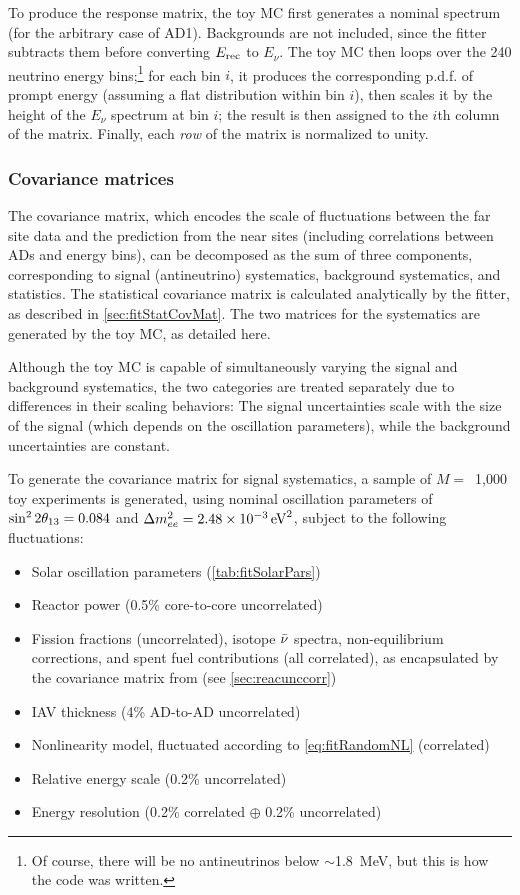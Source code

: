 \documentclass[../thesis.tex]{subfiles}
\begin{document}
To produce the response matrix, the toy MC first generates a nominal spectrum (for the arbitrary case of AD1). Backgrounds are not included, since the fitter subtracts them before converting $E_\mathrm{rec}$ to $E_\nu$. The toy MC then loops over the 240 neutrino energy bins;\footnote{Of course, there will be no antineutrinos below $\sim$1.8~MeV, but this is how the code was written.} for each bin $i$, it produces the corresponding p.d.f. of prompt energy (assuming a flat distribution within bin $i$), then scales it by the height of the $E_\nu$ spectrum at bin $i$; the result is then assigned to the $i$th column of the matrix. Finally, each \emph{row} of the matrix is normalized to unity.

\subsubsection{Covariance matrices}

The covariance matrix, which encodes the scale of fluctuations between the far site data and the prediction from the near sites (including correlations between ADs and energy bins), can be decomposed as the sum of three components, corresponding to signal (antineutrino) systematics, background systematics, and statistics. The statistical covariance matrix is calculated analytically by the fitter, as described in \autoref{sec:fitStatCovMat}. The two matrices for the systematics are generated by the toy MC, as detailed here.

Although the toy MC is capable of simultaneously varying the signal and background systematics, the two categories are treated separately due to differences in their scaling behaviors: The signal uncertainties scale with the size of the signal (which depends on the oscillation parameters), while the background uncertainties are constant.

To generate the covariance matrix for signal systematics, a sample of $M =$~1,000 toy experiments is generated, using nominal oscillation parameters of $\sin^2 2\theta_{13} = 0.084$ and $\Delta m^2_{ee} = \SI{2.48e-3}{eV^2}$, subject to the following fluctuations:

\begin{itemize}
\item Solar oscillation parameters (\autoref{tab:fitSolarPars})
\item Reactor power (0.5\% core-to-core uncorrelated)
\item Fission fractions (uncorrelated), isotope $\bar\nu$ spectra, non-equilibrium corrections, and spent fuel contributions (all correlated), as encapsulated by the covariance matrix from \cite{Lewis} (see \autoref{sec:reacunccorr})
\item IAV thickness (4\% AD-to-AD uncorrelated)
\item Nonlinearity model, fluctuated according to \autoref{eq:fitRandomNL} (correlated)
\item Relative energy scale (0.2\% uncorrelated)
\item Energy resolution (0.2\% correlated $\oplus$ 0.2\% uncorrelated)
\end{itemize}
\end{document}
